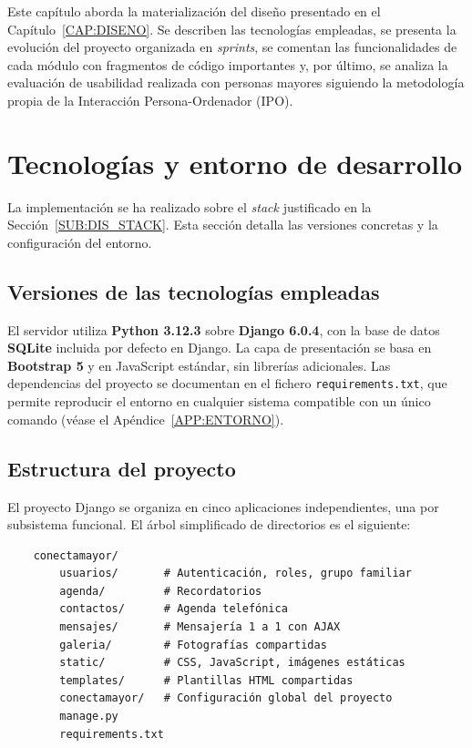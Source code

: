 
Este capítulo aborda la materialización del diseño presentado en el
Capítulo~\ref{CAP:DISENO}. Se describen las tecnologías empleadas, se presenta la evolución del proyecto
organizada en \emph{sprints}, se comentan las funcionalidades de cada
módulo con fragmentos de código importantes y, por último, se analiza
la evaluación de usabilidad realizada con personas mayores siguiendo la
metodología propia de la Interacción Persona-Ordenador (IPO).


\section{Tecnologías y entorno de desarrollo\label{SEC:IMP_TECNOLOGIAS}}

La implementación se ha realizado sobre el \emph{stack} justificado en la
Sección~\ref{SUB:DIS_STACK}. Esta sección detalla las versiones concretas y
la configuración del entorno.

\subsection{Versiones de las tecnologías
empleadas\label{SUB:IMP_VERSIONES}}

El servidor utiliza \textbf{Python 3.12.3} sobre \textbf{Django 6.0.4},
con la base de datos \textbf{SQLite} incluida por defecto en Django. La
capa de presentación se basa en \textbf{Bootstrap 5} y en JavaScript
estándar, sin librerías adicionales. Las dependencias del
proyecto se documentan en el fichero \texttt{requirements.txt}, que
permite reproducir el entorno en cualquier sistema compatible con un
único comando (véase el Apéndice~\ref{APP:ENTORNO}).

\subsection{Estructura del proyecto\label{SUB:IMP_ESTRUCTURA}}

El proyecto Django se organiza en cinco aplicaciones independientes, una
por subsistema funcional. El árbol simplificado de directorios es el
siguiente:
\begin{verbatim}
    conectamayor/
        usuarios/       # Autenticación, roles, grupo familiar
        agenda/         # Recordatorios
        contactos/      # Agenda telefónica
        mensajes/       # Mensajería 1 a 1 con AJAX
        galeria/        # Fotografías compartidas
        static/         # CSS, JavaScript, imágenes estáticas
        templates/      # Plantillas HTML compartidas
        conectamayor/   # Configuración global del proyecto
        manage.py
        requirements.txt
\end{verbatim}

